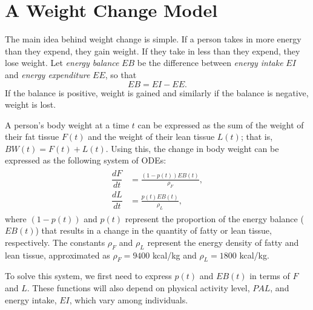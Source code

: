 \section*{A Weight Change Model}
The main idea behind weight change is simple. If a person takes in more energy than they expend, they gain weight. If they take in less than they expend, they lose weight. Let \emph{energy balance} $EB$ be the difference between \emph{energy intake} $EI$ and \emph{energy expenditure} $EE$, so that $$EB = EI - EE.$$
If the balance is positive, weight is gained and similarly if the balance is negative, weight is lost. 

A person's body weight at a time $t$ can be expressed as the sum of the weight of their fat tissue $F(t)$ and the weight of their lean tissue $L(t)$; that is, $BW(t) = F(t) + L(t)$. Using this, the change in body weight can be expressed as the following system of ODEs:
\begin{align}
        \begin{split}
                \dfrac{dF}{dt} &= \frac{(1-p(t)) EB(t)}{\rho_F},\\
                \dfrac{dL}{dt} &= \frac{p(t) EB(t)}{\rho_L},
        \end{split}\label{eqn:compartment}
\end{align}
where $(1-p(t))$ and $p(t)$ represent the proportion of the energy balance ($EB(t)$) that results in a change in the quantity of fatty or lean tissue, respectively. The constants $\rho_F$ and $\rho_L$ represent the energy density of fatty and lean tissue, approximated as $\rho_F=9400$ kcal/kg and $\rho_L=1800$ kcal/kg.

To solve this system, we first need to express $p(t)$ and $EB(t)$ in terms of $F$ and $L$. These functions will also depend on physical activity level, $PAL$, and energy intake, $EI$, which vary among individuals.%

